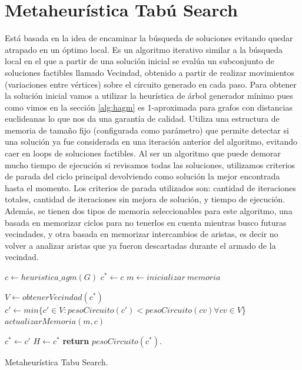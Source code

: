 \documentclass[10pt,a4paper]{article}
\begin{document}
\section{Metaheurística Tabú Search}
Está basada en la idea de encaminar la búsqueda de soluciones evitando quedar atrapado en un óptimo local. Es un algoritmo iterativo similar a la búsqueda local en el que a partir de una solución inicial se evalúa un subconjunto de soluciones factibles llamado Vecindad, obtenido a partir de realizar movimientos (variaciones entre vértices) sobre el circuito generado en cada paso.
Para obtener la solución inicial vamos a utilizar la heurística de árbol generador mínimo pues como vimos en la sección \ref{alg:hagm} es 1-aproximada para grafos con distancias euclideanas lo que nos da una garantía de calidad.
Utiliza una estructura de memoria de tamaño fijo (configurada como parámetro) que permite detectar si una solución ya fue considerada en una iteración anterior del algoritmo, evitando caer en loops de soluciones factibles.
Al ser un algoritmo que puede demorar mucho tiempo de ejecución si revisamos todas las soluciones, utilizamos criterios de parada del ciclo principal devolviendo como solución la mejor encontrada hasta el momento. 
Los criterios de parada utilizados son: cantidad de iteraciones totales, cantidad de iteraciones sin mejora de solución, y tiempo de ejecución.
Además, se tienen dos tipos de memoria seleccionables para este algoritmo, una basada en memorizar ciclos para no tenerlos en cuenta mientras busco futuras vecindades, y otra basada en memorizar intercambios de aristas, es decir no volver a analizar aristas que ya fueron descartadas durante el armado de la vecindad. 

\begin{algorithm}
	\begin{algorithmic}[1]
		
		\State $c \leftarrow heuristica\_agm(G)$ 
		\State $c^* \leftarrow c$
		\State $m \leftarrow inicializar\ memoria$
		
            \State $V \leftarrow obtenerVecindad(c^*)$ 
            \State $c' \leftarrow min\{c' \in V : pesoCircuito(c') < pesoCircuito(cv) \forall cv \in V$\} 
            \State $actualizarMemoria(m, c)$
            
             
                \State $c^* \leftarrow c'$
            \EndIf
		\EndWhile
		\State $H \leftarrow c^*$
		\State \textbf{return} $pesoCircuito(c^*)$.

		\EndFunction
	\end{algorithmic}
	\caption{Metaheurística Tabu Search.}
	\label{alg:mheur}
\end{algorithm} 	
\end{document}
